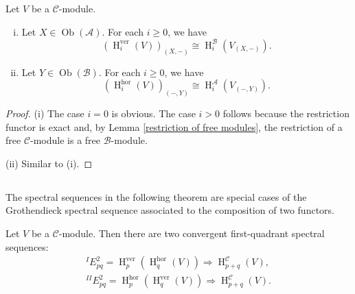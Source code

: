 \documentclass{amsart}
\numberwithin{equation}{section}
\DeclareMathOperator{\HH}{H}
\DeclareMathOperator{\Ob}{Ob}
\newcommand{\C}{{\mathscr{C}}}
\newcommand{\A}{{\mathscr{A}}}
\newcommand{\B}{{\mathscr{B}}}
\newcommand{\hor}{{\mathrm{hor}}}
\newcommand{\ver}{{\mathrm{ver}}}
\begin{document}
\begin{lemma} \label{homology_and_restrict}
   Let $V$ be a $\C$-module. 
   \begin{enumerate}[(i)]
      \item Let $X\in \Ob(\A)$. For each $i\geqslant 0$, we have
      \[ (\HH^{\ver}_i(V))_{(X,-)} \cong \HH^{\B}_i(V_{(X,-)}). \] 
      \item Let $Y\in \Ob(\B)$. For each $i\geqslant 0$, we have
      \[ (\HH^{\hor}_i(V))_{(-,Y)} \cong \HH^{\A}_i(V_{(-,Y)}). \] 
   \end{enumerate}
\end{lemma}
\begin{proof}
   (i) The case $i=0$ is obvious. The case $i>0$ follows because the restriction functor is exact and, by Lemma \ref{restriction of free modules}, the restriction of a free $\C$-module is a free $\B$-module.
   
   (ii) Similar to (i).
\end{proof}




\subsection{}
The spectral sequences in the following theorem are special cases of the Grothendieck spectral sequence associated to the composition of two functors.

\begin{theorem} \label{grothendieck}
Let $V$ be a $\C$-module. Then there are two convergent first-quadrant spectral sequences:
\begin{gather*}
^{I}\!E^2_{pq} = \HH^\ver_p (\HH^\hor_q (V)) \Rightarrow \HH^{\C}_{p+q}(V),\\
^{II}\!E^2_{pq} = \HH^\hor_p (\HH^\ver_q (V)) \Rightarrow \HH^{\C}_{p+q}(V).
\end{gather*}
\end{theorem}
\end{document}
